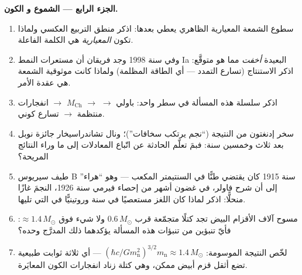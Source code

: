 \begin{problem}
\medskip\noindent\textbf{الجزء الرابع --- الشموع و
الكون.}
\begin{enumerate}[resume]
  \item سطوع الشمعة المعيارية الظاهري يعطي
        بعدها: اذكر منطق التربيع العكسي ولماذا تكون
        \emph{المعيارية} هي الكلمة الفاعلة.
  \item وفي سنة 1998 وجد فريقان أن مستعرات النمط Ia البعيدة
        \emph{أخفت} مما هو متوقَّع: اذكر الاستنتاج
        (تسارع التمدد --- أي الطاقة المظلمة) ولماذا كانت
        موثوقية الشمعة هي عقدة الأمر.
  \item اذكر سلسلة هذه المسألة في سطر واحد: باولي $\to$
         $\to$ $M_{\text{Ch}}$ $\to$ انفجارات
        منتظمة $\to$ تسارع كوني.
  \item سخر إدنغتون من النتيجة (``نجم يرتكب
        سخافات'')؛ ونال تشاندراسيخار جائزة نوبل
        بعد ثلاث وخمسين سنة: فبمَ تعلّم الحادثة عن
        اتّباع المعادلات إلى ما وراء النتائج المريحة؟
  \item طيف سيريوس B سنة 1915 كان يقتضي طنًّا في السنتيمتر
        المكعب --- وهو ``هراء'' إلى أن شرح فاولر، في غضون أشهر من
        إحصاء فيرمي سنة 1926، النجمَ غازًا
        منحلًّا: اذكر لماذا كان اللغز مستعصيًا في سنة
        وروتينيًّا في التي تليها.
  \item مسوح آلاف الأقزام البيض تجد كتلًا
        متجمّعة قرب $0.6\,M_\odot$ ولا شيء فوق
        $\approx1.4\,M_\odot$: فأيّ تنبؤين من تنبؤات هذه
        المسألة يؤكدهما ذلك المدرَّج وحده؟
  \item لخّص النتيجة الموسومة: $(\hbar c/Gm_{\text{n}}^2)^{
        3/2}m_{\text{n}} \approx 1.4\,M_\odot$ --- أي ثلاثة ثوابت
        طبيعية تضع أثقل قزم أبيض ممكن، وهي
        كتلة زناد انفجارات الكون المعايَرة.
\end{enumerate}
\end{problem}
